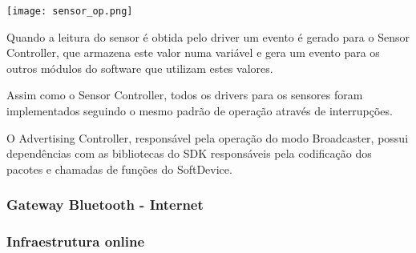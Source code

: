 \begin{center}
	\centering 
	\texttt{[image: sensor\_op.png]}
	\label{fig:sensor_op}
\end{center} 

Quando a leitura do sensor é obtida pelo driver um evento é gerado para o Sensor
Controller, que armazena este valor numa variável e gera um evento para os
outros módulos do software que utilizam estes valores.

Assim como o Sensor Controller, todos os drivers para os sensores foram
implementados seguindo o mesmo padrão de operação através de interrupções.


O Advertising Controller, responsável pela operação do modo Broadcaster, possui
dependências com as bibliotecas do SDK responsáveis pela codificação dos pacotes
e chamadas de funções do SoftDevice.




\subsubsection{Gateway Bluetooth - Internet}

\subsubsection{Infraestrutura online}
